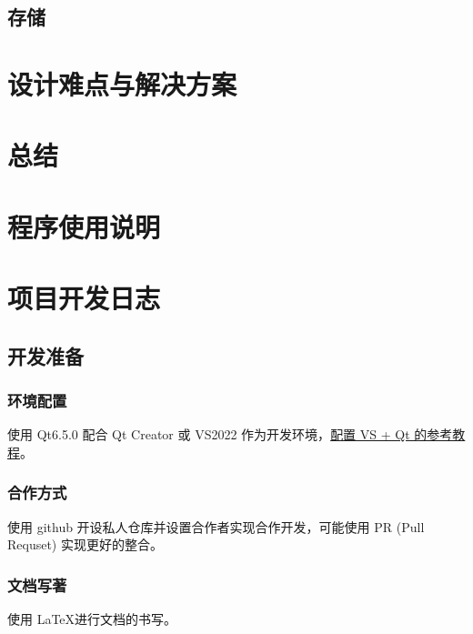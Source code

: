 \documentclass{./source/Report}
\begin{document}
\subsection{存储}

\section{设计难点与解决方案}

\section{总结}

\newpage
\appendix
\section{程序使用说明}

\section{项目开发日志}
\subsection{开发准备}
\subsubsection{环境配置}
使用 Qt6.5.0 配合 Qt Creator 或 VS2022 作为开发环境，\href{https://blog.csdn.net/m0_62919535/article/details/129340079}{配置 VS + Qt 的参考教程}。

\subsubsection{合作方式}
使用 github 开设私人仓库并设置合作者实现合作开发，可能使用 PR (Pull Requset) 实现更好的整合。

\subsubsection{文档写著}
使用 \LaTeX 进行文档的书写。
\end{document}
